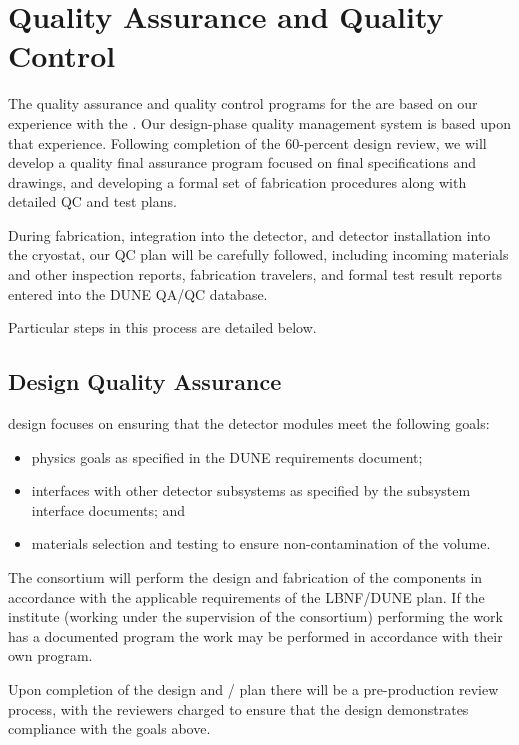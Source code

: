 \section{Quality Assurance and Quality Control}
\label{sec:fdsp-pd-qaqc}

The quality assurance and quality control programs for the  are based on our experience with the .  Our design-phase quality management system is based upon that experience.  Following completion of the 60-percent design review, we will develop a quality final assurance program focused on final specifications and drawings, and developing a formal set of fabrication procedures along with detailed QC and test plans.

During fabrication, integration into the detector, and detector installation into the cryostat, our QC plan will be carefully followed, including incoming materials and other inspection reports, fabrication travelers, and formal test result reports entered into the DUNE QA/QC database.

Particular steps in this process are detailed below.

\subsection{Design Quality Assurance}
\label{sec:fdsp-pd-designqa}

 design  focuses on ensuring that the detector modules meet the following goals:
\begin{itemize}
\item physics goals as specified in the DUNE requirements document;
\item interfaces with other detector subsystems as specified by the subsystem interface documents; and
\item materials selection and testing to ensure non-contamination of the \lar volume.
\end{itemize}

The  consortium will perform the design and fabrication of the components in accordance with the applicable requirements of the LBNF/DUNE  plan. If the institute (working under the supervision of the consortium) performing the work has a documented  program the work may be performed in accordance with their own program.

Upon completion of the  design and / plan there will be a pre-production review process, with the reviewers charged to ensure that the design demonstrates compliance with the goals above.

